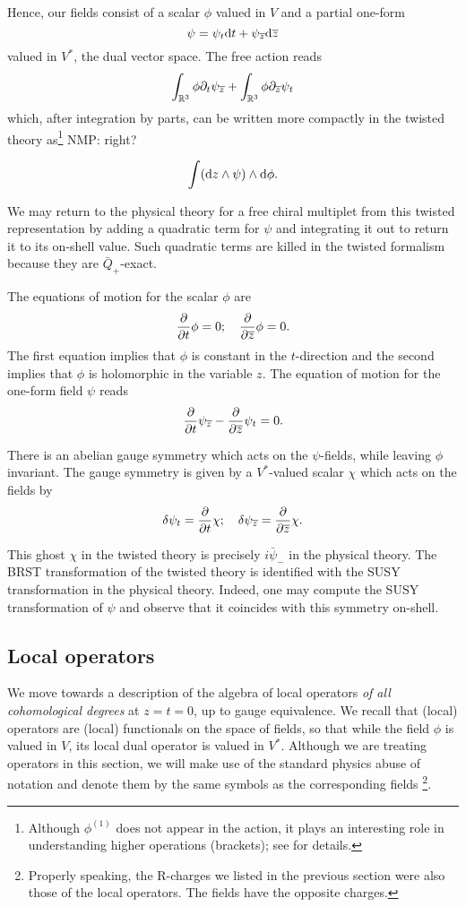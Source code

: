 \documentclass[11pt]{amsart}
\def\natalie#1{{\textcolor{green!65!black}{NMP: {#1}}}}
\begin{document}
Hence, our fields consist of a scalar $\phi$ valued in $V$ and a partial one-form 
\[
\psi = \psi_t {\rm d} t + \psi_{\overline{z}} {\rm d} {\overline{z}} 
\]
valued in $V^*$, the dual vector space.
The free action reads
\[
\int_{\mathbb R^3} \phi \partial_t \psi_{\overline{z}} + \int_{\mathbb R^3} \phi \partial_{\overline{z}} \psi_t 
\]
which, after integration by parts, can be written more compactly in the twisted theory as\footnote{Although $\phi^{(1)}$ does not appear in the action, it plays an interesting role in understanding higher operations (brackets); see \cite{CDG} for details.} \natalie{right?}

\[
\int({\rm d} z \wedge \psi) \wedge {\rm d} \phi.
\]

We may return to the physical theory for a free chiral multiplet from this twisted representation by adding a quadratic term for $\psi$ and integrating it out to return it to its on-shell value. Such quadratic terms are killed in the twisted formalism because they are $\bar{Q}_+$-exact.  

The equations of motion for the scalar $\phi$ are
\[
\frac{\partial}{\partial t} \phi = 0; \quad
\frac{\partial}{\partial {\overline{z}}} \phi = 0 .
\]
The first equation implies that $\phi$ is constant in the $t$-direction and the second implies that $\phi$ is holomorphic in the variable $z$. 
The equation of motion for the one-form field $\psi$ reads
\[
\frac{\partial}{\partial t} \psi_{\overline{z}} - \frac{\partial}{\partial {\overline{z}}} \psi_t = 0 .
\]

There is an abelian gauge symmetry which acts on the $\psi$-fields, while leaving $\phi$ invariant.
The gauge symmetry is given by a $V^*$-valued scalar $\chi$ which acts on the fields by
\begin{equation}\label{eqn:freegauge}
\delta \psi_t = \frac{\partial}{\partial t} \chi; \quad
\delta \psi_{\overline{z}} = \frac{\partial}{\partial {\overline{z}}} \chi .
\end{equation}

This ghost $\chi$ in the twisted theory is precisely $i \bar{\psi}_-$ in the physical theory. The BRST transformation of the twisted theory is identified with the SUSY transformation in the physical theory. Indeed, one may compute the SUSY transformation of $\psi$ and observe that it coincides with this symmetry on-shell. 

\subsection{Local operators}

We move towards a description of the algebra of local operators \textit{of all cohomological degrees} at $z = t = 0$, up to gauge equivalence. 
We recall that (local) operators are (local) functionals on the space of fields, so that while the field $\phi$ is valued in $V$, its local dual operator is valued in $V^*$. Although we are treating operators in this section, we will make use of the standard physics abuse of notation and denote them by the same symbols as the corresponding fields \footnote{Properly speaking, the R-charges we listed in the previous section were also those of the local operators. The fields have the opposite charges.}. 
\end{document}
